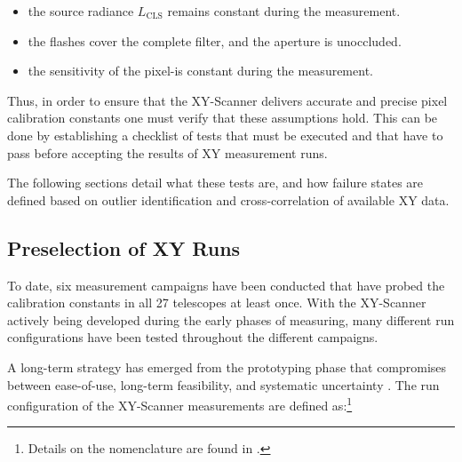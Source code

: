 \vspace{0.4cm}
\begingroup
\renewcommand\arraystretch{1.3}
\begin{itemize}
\item the source radiance $L_\mathrm{CLS}$ remains constant during the 
measurement.
\item the \CLS flashes cover the complete filter, and the aperture is 
unoccluded.
\item the sensitivity of the \FD pixel-\PMTs is constant during the measurement.
\end{itemize}
\endgroup
\vspace{0.4cm}

Thus, in order to ensure that the XY-Scanner delivers accurate and precise pixel
calibration constants one must verify that these assumptions hold. This can be
done by establishing a checklist of tests that must be executed and that have to
pass before accepting the results of XY measurement runs.

The following sections detail what these tests are, and how failure states are 
defined based on outlier identification and cross-correlation of available XY
data.

\subsection{Preselection of XY Runs}

To date, six measurement campaigns have been conducted that have probed the
calibration constants in all 27 telescopes at least once. With the XY-Scanner 
actively being developed during the early phases of measuring, many different 
run configurations have been tested throughout the different campaigns. 

A long-term strategy has emerged from the prototyping phase that compromises 
between ease-of-use, long-term feasibility, and systematic uncertainty 
\cite{filipQualityAssuranceXY2024}. The run configuration of the XY-Scanner 
measurements are defined as:\footnote{Details on the nomenclature are found in 
\cite{schaferXYScannerVersatileMethod2023}.}

